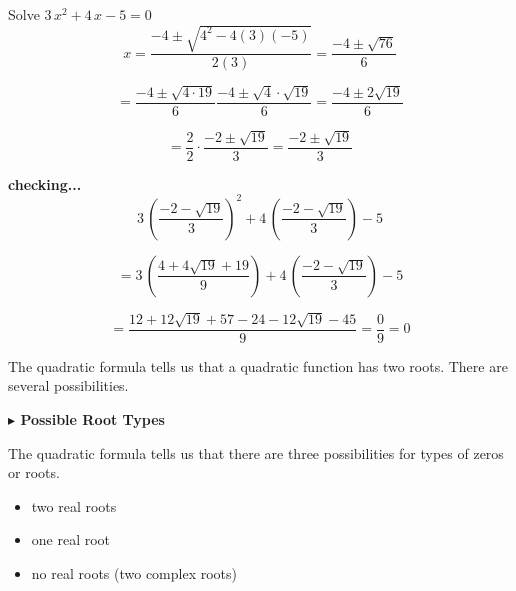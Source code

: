 \documentclass{ximera}
\begin{document}
\begin{example}


Solve $3 \, x^2 + 4 \, x - 5 = 0$ \\


\[
x = \frac{-4 \pm \sqrt{4^2 - 4 (3)(-5)}}{2(3)} = \frac{-4 \pm \sqrt{76}}{6}
\]

\[
= \frac{-4 \pm \sqrt{4 \cdot 19}}{6} \frac{-4 \pm \sqrt{4} \cdot \sqrt{19}}{6} = \frac{-4 \pm 2\sqrt{19}}{6}
\]

\[
= \frac{2}{2} \cdot \frac{-2 \pm \sqrt{19}}{3} = \frac{-2 \pm \sqrt{19}}{3}
\]



\textbf{checking...} \\


\[
3 \, \left( \frac{-2 - \sqrt{19}}{3} \right)^2 + 4 \, \left( \frac{-2 - \sqrt{19}}{3} \right) - 5 
\]

\[
=  3 \, \left( \frac{4 + 4\sqrt{19}+19}{9} \right) + 4 \, \left( \frac{-2 - \sqrt{19}}{3} \right) - 5
\]


\[
= \frac{12 + 12\sqrt{19} + 57 - 24 - 12\sqrt{19} - 45}{9} = \frac{0}{9} = 0
\]

\end{example}

The quadratic formula tells us that a quadratic function has two roots.  There are several possibilities.




\textbf{\textcolor{blue!55!black}{$\blacktriangleright$ Possible Root Types}} 


The quadratic formula tells us that there are three possibilities for types of zeros or roots.


\begin{itemize}
\item two real roots
\item one real root
\item no real roots (two complex roots)
\end{itemize}
\end{document}
